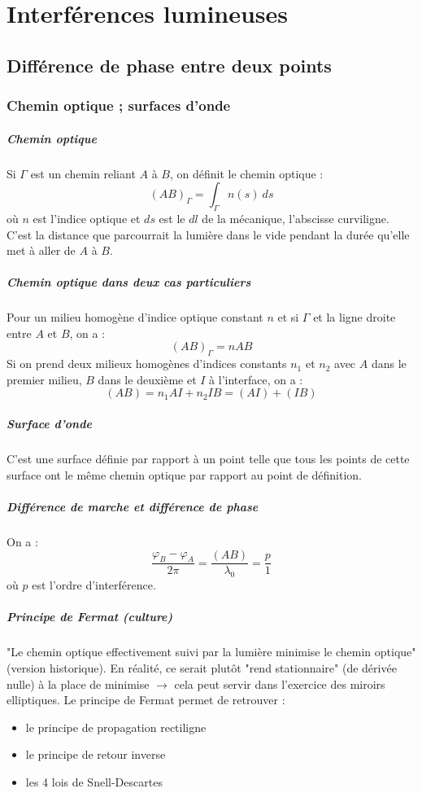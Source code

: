 \documentclass[french]{book}
\theoremstyle{plain}
\theoremstyle{definition}
\theoremstyle{remark}
\begin{document}
\chapter{Interférences lumineuses}
\localtableofcontents
\section{Différence de phase entre deux points}
\subsection{Chemin optique ; surfaces d'onde}
\paragraph{Chemin optique} Si $\Gamma$ est un chemin reliant $A$ à $B$, on définit le chemin optique : $$(AB)_\Gamma=\int_{\Gamma}n(s)\ ds$$ où $n$ est l'indice optique et $ds$ est le $dl$ de la mécanique, l'abscisse curviligne. C'est la distance que parcourrait la lumière dans le vide pendant la durée qu'elle met à aller de $A$ à $B$.
\paragraph{Chemin optique dans deux cas particuliers} Pour un milieu homogène d'indice optique constant $n$ et si $\Gamma$ et la ligne droite entre $A$ et $B$, on a : $$(AB)_\Gamma=nAB$$ Si on prend deux milieux homogènes d'indices constants $n_1$ et $n_2$ avec $A$ dans le premier milieu, $B$ dans le deuxième et $I$ à l'interface, on a : $$(AB)=n_1AI+n_2IB=(AI)+(IB)$$
\paragraph{Surface d'onde} C'est une surface définie par rapport à un point telle que tous les points de cette surface ont le même chemin optique par rapport au point de définition.
\paragraph{Différence de marche et différence de phase} On a : $$\frac{\varphi_B-\varphi_A}{2\pi}=\frac{(AB)}{\lambda_0}=\frac{p}{1}$$ où $p$ est l'ordre d'interférence.
\paragraph{Principe de Fermat (culture)} "Le chemin optique effectivement suivi par la lumière minimise le chemin optique" (version historique). En réalité, ce serait plutôt "rend stationnaire" (de dérivée nulle) à la place de minimise $\to$ cela peut servir dans l'exercice des miroirs elliptiques. Le principe de Fermat permet de retrouver :
\begin{itemize}
	\item le principe de propagation rectiligne
	\item le principe de retour inverse
	\item les 4 lois de Snell-Descartes
\end{itemize}
\end{document}
